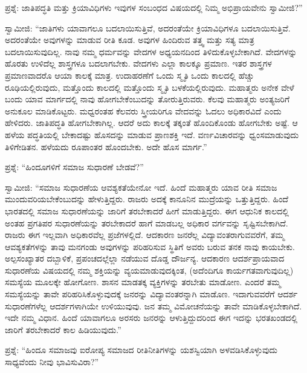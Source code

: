 ಪ್ರಶ್ನೆ: ಜಾತಿಪದ್ಧತಿ ಮತ್ತು ಕ್ರಿಯಾವಿಧಿಗಳು ಇವುಗಳ ಸಂಬಂಧದ ವಿಷಯದಲ್ಲಿ ನಿಮ್ಮ ಅಭಿಪ್ರಾಯವೇನು ಸ್ವಾಮೀಜಿ?”

ಸ್ವಾಮೀಜಿ: “ಜಾತಿಗಳು ಯಾವಾಗಲೂ ಬದಲಾಯಿಸುತ್ತಿವೆ, ಅದರಂತೆಯೇ ಕ್ರಿಯಾವಿಧಿಗಳೂ ಬದಲಾಯಿಸುತ್ತಿವೆ. ಅದರಂತೆಯೇ ಅವುಗಳನ್ನು ಮಾಡುವ ರೀತಿ ಕೂಡ. ಅವುಗಳ ಹಿಂದಿರುವ ತತ್ತ್ವ ಮತ್ತು ಸತ್ಯ ಮಾತ್ರ ಬದಲಾಯಿಸುವುದಿಲ್ಲ. ನಾವು ನಮ್ಮ ಧರ್ಮವನ್ನು ವೇದಗಳ ಅಧ್ಯಯನದಿಂದ ತಿಳಿದುಕೊಳ್ಳಬೇಕಾಗಿದೆ. ವೇದಗಳನ್ನು ಹೊರತು ಉಳಿದೆಲ್ಲ ಶಾಸ್ತ್ರಗಳೂ ಬದಲಾಗಬೇಕು. ವೇದಗಳು ಎಲ್ಲಾ ಕಾಲಕ್ಕೂ ಪ್ರಮಾಣ. ಇತರ ಶಾಸ್ತ್ರಗಳ ಪ್ರಮಾಣವಾದರೊ ಆಯಾ ಕಾಲಕ್ಕೆ ಮಾತ್ರ. ಉದಾಹರಣೆಗೆ ಒಂದು ಸ್ಮೃತಿ ಒಂದು ಕಾಲದಲ್ಲಿ ಹೆಚ್ಚು ರೂಢಿಯಲ್ಲಿರುವುದು, ಮತ್ತೊಂದು ಕಾಲದಲ್ಲಿ ಮತ್ತೊಂದು ಸ್ಮೃತಿ ಬಳಕೆಯಲ್ಲಿರುವುದು. ಮಹಾತ್ಮರು ಅನೇಕ ವೇಳೆ ಬಂದು ಯಾವ ಮಾರ್ಗದಲ್ಲಿ ನಾವು ಹೋಗಬೇಕೆಂಬುದನ್ನು ತೋರುತ್ತಿರುವರು. ಕೆಲವು ಮಹಾತ್ಮರು ಅಂತ್ಯಜರಿಗೆ ಅನುಕೂಲ ಮಾಡಿಕೊಟ್ಟರು. ಮಧ್ವರಂತಹ ಕೆಲವರು ಸ್ತ್ರೀಯರಿಗೂ ವೇದವನ್ನು ಓದಲು ಅಧಿಕಾರವಿದೆ ಎಂದು ಹೇಳಿದರು. ಜಾತಿಪದ್ಧತಿ ಹೋಗಬೇಕಾಗಿಲ್ಲ. ಆದರೆ ಅದು ಕಾಲಕ್ಕೆ ತಕ್ಕಂತೆ ಹೊಂದಿಕೊಂಡು ಹೋಗಬೇಕು ಅಷ್ಟೆ. ಆ ಹಳೆಯ ಪದ್ಧತಿಯಲ್ಲಿ ಬೇಕಾದಷ್ಟು ಹೊಸದನ್ನು ಮಾಡುವ ಪ್ರಾಣಶಕ್ತಿ ಇದೆ. ವರ್ಣವಿಚಾರವನ್ನು ಧ್ವಂಸಮಾಡುವುದು ತಿಳಿಗೇಡಿತನ. ಹಳೆಯದು ರೂಪಾಂತರ ಹೊಂದಬೇಕು. ಅದೇ ಹೊಸ ಮಾರ್ಗ.”

ಪ್ರಶ್ನೆ: “ಹಿಂದೂಗಳಿಗೆ ಸಮಾಜ ಸುಧಾರಣೆ ಬೇಡವೆ?”

ಸ್ವಾಮೀಜಿ: “ಸಮಾಜ ಸುಧಾರಣೆಯ ಆವಶ್ಯಕತೆಯೇನೋ ಇದೆ. ಹಿಂದೆ ಮಹಾತ್ಮರು ಯಾವ ರೀತಿ ಸಮಾಜ ಮುಂದುವರಿಯಬೇಕೆಂಬುದನ್ನು ಹೇಳುತ್ತಿದ್ದರು. ರಾಜರು ಅದಕ್ಕೆ ಕಾನೂನಿನ ಮುದ್ರೆಯನ್ನು ಒತ್ತುತ್ತಿದ್ದರು. ಹಿಂದೆ ಭಾರತದಲ್ಲಿ ಸಮಾಜ ಸುಧಾರಣೆಯನ್ನು ಜಾರಿಗೆ ತರಬೇಕಾದರೆ ಹೀಗೆ ಮಾಡುತ್ತಿದ್ದರು. ಈಗ ಆಧುನಿಕ ಕಾಲದಲ್ಲಿ ಅಂತಹ ಪ್ರಗತಿಪರ ಸುಧಾರಣೆಯನ್ನು ತರಬೇಕಾದರೆ ಹಾಗೆ ಮಾಡಬಲ್ಲ ಅಧಿಕಾರ ವರ್ಗವನ್ನು ಸೃಷ್ಟಿಸಬೇಕಾಗಿದೆ. ರಾಜರು ಈಗ ಇಲ್ಲವಾಗಿ ಅಧಿಕಾರವೆಲ್ಲ ಪ್ರಜೆಗಳಲ್ಲಿದೆ. ಆದಕಾರಣ ಜನರೆಲ್ಲ ವಿದ್ಯಾವಂತರಾಗುವವರೆಗೆ, ತಮ್ಮ ಆವಶ್ಯಕತೆಗಳನ್ನು ತಾವು ಮನಗಂಡು ಅವುಗಳನ್ನು ಪರಿಹರಿಸುವ ಸ್ಥಿತಿಗೆ ಅವರು ಬರುವ ತನಕ ನಾವು ಕಾಯಬೇಕು. ಅಲ್ಪಸಂಖ್ಯಾತರ ದಬ್ಬಾಳಿಕೆ, ಪ್ರಪಂಚದಲ್ಲೆಲ್ಲಾ ನಡೆಯುವ ದೊಡ್ಡ ದೌರ್ಜನ್ಯ. ಆದಕಾರಣ ಆದರ್ಶಪ್ರಾಯವಾದ ಸುಧಾರಣೆಯ ವಿಷಯದಲ್ಲಿ ನಮ್ಮ ಶಕ್ತಿಯನ್ನು ವ್ಯಯಮಾಡುವುದಕ್ಕಿಂತ, (ಅದೆಂದಿಗೂ ಕಾರ್ಯಗತವಾಗುವುದಿಲ್ಲ) ಸಮಸ್ಯೆಯ ಮೂಲಕ್ಕೇ ಹೋಗೋಣ. ಶಾಸನ ಮಾಡತಕ್ಕ ವ್ಯಕ್ತಿಗಳನ್ನು ತರಬೇತು ಮಾಡೋಣ. ಎಂದರೆ ತಮ್ಮ ಸಮಸ್ಯೆಯನ್ನು ತಾವೇ ಪರಿಹರಿಸಿಕೊಳ್ಳುವುದಕ್ಕೆ ಜನರನ್ನು ವಿದ್ಯಾವಂತರನ್ನಾಗಿ ಮಾಡೊಣ. ಇದಾಗುವವರೆಗೆ ಆದರ್ಶ ಸುಧಾರಣೆಗಳೆಲ್ಲ ಆದರ್ಶಗಳಾಗಿಯೇ ಉಳಿಯುವುವು. ಜನ ತಮ್ಮ ವಿಮೋಚನೆಯನ್ನು ತಾವೇ ಮಾಡಿಕೊಳ್ಳಬೇಕಾಗಿದೆ. ಇದೇ ನಮ್ಮ ವಿಧಾನ. ಹಿಂದೆ ಯಾವಾಗಲೂ ಅರಸರು ಜನರನ್ನು ಆಳುತ್ತಿದ್ದುದರಿಂದ ಈಗ ಇದನ್ನು ಭರತಖಂಡದಲ್ಲಿ ಜಾರಿಗೆ ತರಬೇಕಾದರೆ ಕಾಲ ಹಿಡಿಯುವುದು.”

ಪ್ರಶ್ನೆ: “ಹಿಂದೂ ಸಮಾಜವು ಐರೋಪ್ಯ ಸಮಾಜದ ರೀತಿನೀತಿಗಳನ್ನು ಯಶಸ್ವಿಯಾಗಿ ಅಳವಡಿಸಿಕೊಳ್ಳುವುದು ಸಾಧ್ಯವೆಂದು ನೀವು ಭಾವಿಸುವಿರಾ?”

